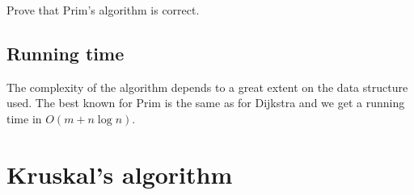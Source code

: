 \begin{Boxample}[17.5]
Prove that Prim's algorithm is correct.
%
%
%
\end{Boxample}

\subsection{Running time}
The complexity of the algorithm depends to a great extent on the data
structure used. The best known for Prim is the same as for Dijkstra
and we  get a running time in $O(m + n\log n)$.

\section{Kruskal's algorithm}

